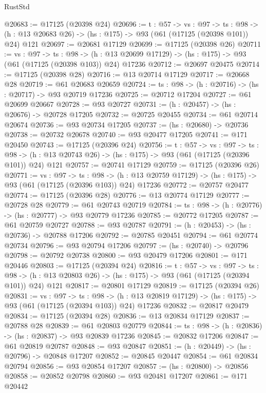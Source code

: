 \begin{lexlean}{RustStd}
\begin{coremodule}
@20683 := @17125 (@20398 @24)
@20696 := {t : @57} ->
  {vs : @97} ->
  {ts : @98} -> (h : @13 @20683 @26) -> (hs : @175) -> @93 (@61 (@17125 (@20398 @101)) @24) @121
@20697 := @20681 @17129
@20699 := @17125 (@20398 @26)
@20711 := {vs : @97} ->
  {ts : @98} ->
  (h : @13 @20699 @17129) -> (hs : @175) -> @93 (@61 (@17125 (@20398 @103)) @24) @17236
@20712 := @20697 @20475
@20714 := @17125 (@20398 @28)
@20716 := @13 @20714 @17129
@20717 := @20668 @28
@20719 := @61 @20683 @20659
@20724 := {ts : @98} -> (h : @20716) -> (hs : @20717) -> @93 @20719 @17236
@20725 := @20712 @17204
@20727 := @61 @20699 @20667
@20728 := @93 @20727
@20731 := (h : @20457) -> (hs : @20676) -> @20728 @17205
@20732 := @20725 @20455
@20734 := @61 @20714 @20674
@20736 := @93 @20734 @17205
@20737 := (hs : @20680) -> @20736
@20738 := @20732 @20678
@20740 := @93 @20477 @17205
@20741 := @171 @20450
@20743 := @17125 (@20396 @24)
@20756 := {t : @57} ->
  {vs : @97} ->
  {ts : @98} -> (h : @13 @20743 @26) -> (hs : @175) -> @93 (@61 (@17125 (@20396 @101)) @24) @121
@20757 := @20741 @17129
@20759 := @17125 (@20396 @26)
@20771 := {vs : @97} ->
  {ts : @98} ->
  (h : @13 @20759 @17129) -> (hs : @175) -> @93 (@61 (@17125 (@20396 @103)) @24) @17236
@20772 := @20757 @20477
@20774 := @17125 (@20396 @28)
@20776 := @13 @20774 @17129
@20777 := @20728 @28
@20779 := @61 @20743 @20719
@20784 := {ts : @98} -> (h : @20776) -> (hs : @20777) -> @93 @20779 @17236
@20785 := @20772 @17205
@20787 := @61 @20759 @20727
@20788 := @93 @20787
@20791 := (h : @20453) -> (hs : @20736) -> @20788 @17206
@20792 := @20785 @20451
@20794 := @61 @20774 @20734
@20796 := @93 @20794 @17206
@20797 := (hs : @20740) -> @20796
@20798 := @20792 @20738
@20800 := @93 @20479 @17206
@20801 := @171 @20446
@20803 := @17125 (@20394 @24)
@20816 := {t : @57} ->
  {vs : @97} ->
  {ts : @98} -> (h : @13 @20803 @26) -> (hs : @175) -> @93 (@61 (@17125 (@20394 @101)) @24) @121
@20817 := @20801 @17129
@20819 := @17125 (@20394 @26)
@20831 := {vs : @97} ->
  {ts : @98} ->
  (h : @13 @20819 @17129) -> (hs : @175) -> @93 (@61 (@17125 (@20394 @103)) @24) @17236
@20832 := @20817 @20479
@20834 := @17125 (@20394 @28)
@20836 := @13 @20834 @17129
@20837 := @20788 @28
@20839 := @61 @20803 @20779
@20844 := {ts : @98} -> (h : @20836) -> (hs : @20837) -> @93 @20839 @17236
@20845 := @20832 @17206
@20847 := @61 @20819 @20787
@20848 := @93 @20847
@20851 := (h : @20449) -> (hs : @20796) -> @20848 @17207
@20852 := @20845 @20447
@20854 := @61 @20834 @20794
@20856 := @93 @20854 @17207
@20857 := (hs : @20800) -> @20856
@20858 := @20852 @20798
@20860 := @93 @20481 @17207
@20861 := @171 @20442

\end{coremodule}
\end{lexlean}

